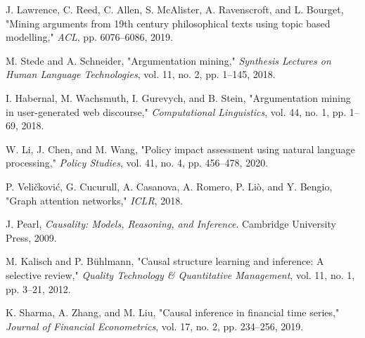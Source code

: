 \documentclass[conference]{IEEEtran}
\begin{document}
\begin{thebibliography}{1}
J. Lawrence, C. Reed, C. Allen, S. McAlister, A. Ravenscroft, and L. Bourget, "Mining arguments from 19th century philosophical texts using topic based modelling," \textit{ACL}, pp. 6076--6086, 2019.

M. Stede and A. Schneider, "Argumentation mining," \textit{Synthesis Lectures on Human Language Technologies}, vol. 11, no. 2, pp. 1--145, 2018.

I. Habernal, M. Wachsmuth, I. Gurevych, and B. Stein, "Argumentation mining in user-generated web discourse," \textit{Computational Linguistics}, vol. 44, no. 1, pp. 1--69, 2018.

W. Li, J. Chen, and M. Wang, "Policy impact assessment using natural language processing," \textit{Policy Studies}, vol. 41, no. 4, pp. 456--478, 2020.

P. Veličković, G. Cucurull, A. Casanova, A. Romero, P. Liò, and Y. Bengio, "Graph attention networks," \textit{ICLR}, 2018.

J. Pearl, \textit{Causality: Models, Reasoning, and Inference}. Cambridge University Press, 2009.

M. Kalisch and P. Bühlmann, "Causal structure learning and inference: A selective review," \textit{Quality Technology \& Quantitative Management}, vol. 11, no. 1, pp. 3--21, 2012.

K. Sharma, A. Zhang, and M. Liu, "Causal inference in financial time series," \textit{Journal of Financial Econometrics}, vol. 17, no. 2, pp. 234--256, 2019.

\end{thebibliography}
\end{document}

